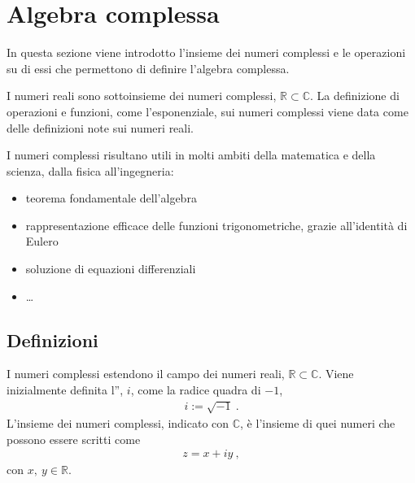 \documentclass[letterpaper,10pt,italian]{jupyterBook}
\begin{document}
\chapter{Algebra complessa}
\label{\detokenize{ch/algebra/complex-algebra:algebra-complessa}}\label{\detokenize{ch/algebra/complex-algebra:math-hs-algebra-complex}}\label{\detokenize{ch/algebra/complex-algebra::doc}}
\sphinxAtStartPar
In questa sezione viene introdotto l’insieme dei numeri complessi e le operazioni su di essi che permettono di definire l’algebra complessa.

\sphinxAtStartPar
I numeri reali sono sottoinsieme dei numeri complessi, \(\mathbb{R} \subset \mathbb{C}\). La definizione di operazioni e funzioni, come l’esponenziale, sui numeri complessi viene data come  delle definizioni note sui numeri reali.

\sphinxAtStartPar
I numeri complessi risultano utili in molti ambiti della matematica e della scienza, dalla fisica all’ingegneria:
\begin{itemize}
\item {} 
\sphinxAtStartPar
teorema fondamentale dell’algebra

\item {} 
\sphinxAtStartPar
rappresentazione efficace delle funzioni trigonometriche, grazie all’identità di Eulero

\item {} 
\sphinxAtStartPar
soluzione di equazioni differenziali

\item {} 
\sphinxAtStartPar
…

\end{itemize}




\section{Definizioni}
\label{\detokenize{ch/algebra/complex-algebra:definizioni}}
\sphinxAtStartPar
I numeri complessi estendono il campo dei numeri reali, \(\mathbb{R} \subset \mathbb{C}\). Viene inizialmente definita l”, \(i\), come la radice quadra di \(-1\),
\begin{equation*}
\begin{split}i := \sqrt{-1} \ .\end{split}
\end{equation*}
\sphinxAtStartPar
L’insieme dei numeri complessi, indicato con \(\mathbb{C}\), è l’insieme di quei numeri che possono essere scritti come
\begin{equation*}
\begin{split}z = x + i y \ ,\end{split}
\end{equation*}
\sphinxAtStartPar
con \(x, \ y \in \mathbb{R}\).
\end{document}
